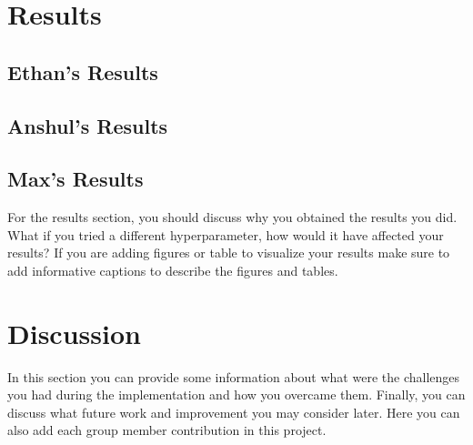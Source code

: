 \documentclass{article}
\begin{document}
\section{Results}


\subsection{Ethan's Results}


\subsection{Anshul's Results}


\subsection{Max's Results}

For the results section, you should discuss why you obtained the results you did. What if you tried a different hyperparameter, how would it have affected your results?
If you are adding figures or table to visualize your results make sure to add informative captions to describe the figures and tables. 


\section{Discussion}

In this section you can provide some information about what were the challenges you had during the implementation and how you overcame them. Finally, you can discuss what future work and improvement you may consider later.
Here you can also add each group member contribution in this project. 



\end{document}

